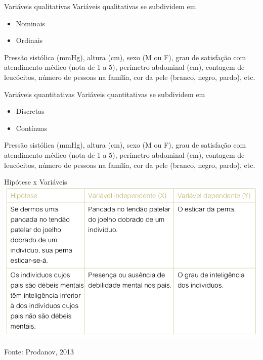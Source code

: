 \documentclass{beamer}
\begin{document}
\begin{frame}{Variáveis qualitativas}
Variáveis qualitativas se subdividem em
  \begin{itemize}
  \item<1-2> Nominais

  \item<3-4> Ordinais
  \end{itemize}


  \begin{example}
    Pressão sistólica (mmHg), altura (cm), \alert{sexo (M ou
      F)}, \alert{grau de satisfação com atendimento médico
      (nota de 1 a 5)}, perímetro abdominal (cm), contagem de
    leucócitos, número de pessoas na família, \alert{cor da
      pele (branco, negro, pardo)}, etc.
  \end{example}
\end{frame}

\begin{frame}{Variáveis quantitativas}
Variáveis quantitativas se subdividem em
  \begin{itemize}
  \item<1-2> Discretas
  \item<3-4> Contínuas
  \end{itemize}
  \begin{example}
    \alert{Pressão sistólica (mmHg)}, \alert{altura
      (cm)}, sexo (M ou F), grau de satisfação com atendimento médico
    (nota de 1 a 5), perímetro abdominal (cm), \alert{contagem
      de leucócitos}, \alert{número de pessoas na família},
    cor da pele (branco, negro, pardo), etc.
  \end{example}
\end{frame}

\begin{frame}{Hipótese x Variáveis}
  \includegraphics[height=0.8\textheight]{Hipoteses_variaveis/hipotese_variaveis}

  Fonte: Prodanov, 2013
\end{frame}
\end{document}

